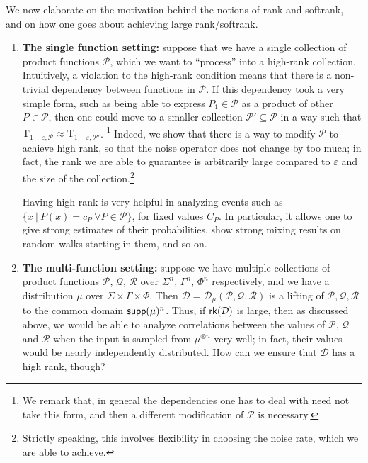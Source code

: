 \documentclass[11pt]{article}
\newcommand\eps{\varepsilon}
\begin{document}
We now elaborate on the motivation behind the notions of rank and softrank, and on how one goes about achieving large rank/softrank.
\begin{enumerate}
    \item {\bf The single function setting:} suppose that we have a single collection of product functions $\mathcal{P}$, which we want to ``process'' into a high-rank collection. Intuitively, a violation to the high-rank condition means that there is a non-trivial dependency between functions in $\mathcal{P}$. If this dependency took a very simple form, such as being able to express $P_1\in\mathcal{P}$ as a product of other $P\in\mathcal{P}$, then one could move to a smaller collection $\mathcal{P}'\subseteq \mathcal{P}$ in a way such that $\mathrm{T}_{1-\eps,\mathcal{P}}\approx \mathrm{T}_{1-\eps,\mathcal{P}'}$.
    \footnote{We remark that, in general the dependencies one has to deal with need not take this form, and then a different modification of $\mathcal{P}$ is necessary.} Indeed, we show that there is a way to modify $\mathcal{P}$ to achieve high rank, so that the noise operator does not change by too much; in fact, the rank we are able to guarantee is arbitrarily large compared to $\eps$ and the size of the collection.\footnote{Strictly speaking, this involves flexibility in choosing the noise rate, which we are able to achieve.} 

    Having high rank is very helpful in analyzing events such as $\{x~|~P(x) = c_P~\forall P\in\mathcal{P}\}$, for fixed values $C_P$. In particular, it allows one to give strong estimates of their probabilities, show strong mixing results on random walks starting in them, and so on.
    
    \item {\bf The multi-function setting:} suppose we have multiple collections of product functions $\mathcal{P}$,
    $\mathcal{Q}$,
    $\mathcal{R}$ over $\Sigma^n$, $\Gamma^n$, $\Phi^n$ respectively, and we have a distribution $\mu$ over $\Sigma\times\Gamma\times \Phi$. Then  $\mathcal{D} = \mathcal{D}_{\mu}(\mathcal{P},\mathcal{Q},\mathcal{R})$ is a lifting of $\mathcal{P},\mathcal{Q},\mathcal{R}$ to the common domain ${\sf supp}(\mu)^{n}$. Thus, if ${\sf rk}(\mathcal{D})$ is large, then as discussed above, we would be able to analyze correlations between the values of $\mathcal{P}$, $\mathcal{Q}$ and $\mathcal{R}$ when the input is sampled from $\mu^{\otimes n}$ very well; in fact, their values would be nearly independently distributed. How can we ensure that $\mathcal{D}$ has a high rank, though?
    

\end{enumerate}
\end{document}
